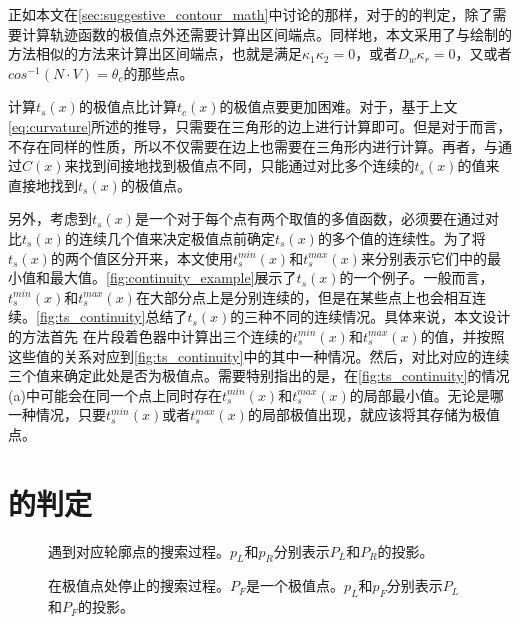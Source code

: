 {\label{sec:suggestive_contour_algorithm}

正如本文在\ref{sec:suggestive_contour_math}中讨论的那样，对于\scon{}的\epsl{}的判定，除了需要计算轨迹函数的极值点外还需要计算出区间端点。同样地，本文采用了与绘制\con{}的方法相似的方法来计算出区间端点，也就是满足$\kappa_1\kappa_2 = 0$，或者$D_w\kappa_r = 0$，又或者$cos^{-1}(N\cdot{V}) = \theta_c$的那些点。

计算$t_s(x)$的极值点比计算$t_c(x)$的极值点要更加困难。对于\con{}，基于上文\autoref{eq:curvature}所述的推导，只需要在三角形的边上进行计算即可。但是对于\scon{}而言，不存在同样的性质，所以不仅需要在边上也需要在三角形内进行计算。再者，与通过$C(x)$来找到间接地找到极值点不同，只能通过对比多个连续的$t_s(x)$的值来直接地找到$t_s(x)$的极值点。

另外，考虑到$t_s(x)$是一个对于每个点有两个取值的多值函数，必须要在通过对比$t_s(x)$的连续几个值来决定极值点前确定$t_s(x)$的多个值的连续性。为了将$t_s(x)$的两个值区分开来，本文使用$t_s^{min}(x)$和$t_s^{max}(x)$来分别表示它们中的最小值和最大值。\autoref{fig:continuity_example}展示了$t_s(x)$的一个例子。一般而言，$t_s^{min}(x)$和$t_s^{max}(x)$在大部分点上是分别连续的，但是在某些点上也会相互连续。\autoref{fig:ts_continuity}总结了$t_s(x)$的三种不同的连续情况。具体来说，本文设计的方法首先
在片段着色器中计算出三个连续的$t_s^{min}(x)$和$t_s^{max}(x)$的值，并按照这些值的关系对应到\autoref{fig:ts_continuity}中的其中一种情况。然后，对比对应的连续三个值来确定此处是否为极值点。需要特别指出的是，在\autoref{fig:ts_continuity}的情况(a)中可能会在同一个点上同时存在$t_s^{min}(x)$和$t_s^{max}(x)$的局部最小值。无论是哪一种情况，只要$t_s^{min}(x)$或者$t_s^{max}(x)$的局部极值出现，就应该将其存储为极值点。

\section{\epsl{}的判定}

\begin{figure}[tbh]
    \centering
    \hfil
    \caption{遇到对应轮廓点的搜索过程。$p_L$和$p_R$分别表示$P_L$和$P_R$的投影。}\label{fig:succeed in image space search}
\end{figure}

\begin{figure}[tbh]
    \centering
    \hfil
    \caption{在极值点处停止的搜索过程。$P_F$是一个极值点。$p_L$和$p_F$分别表示$P_L$和$P_F$的投影。} \label{fig:fail in image space search}
\end{figure}

}
